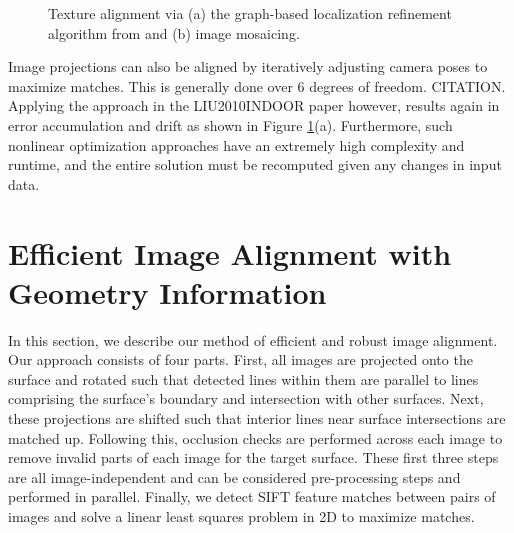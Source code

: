 \documentclass[]{spie}  %
\begin{document}
\begin{figure}
  \centering

  \centering {}
  \caption{Texture alignment via (a) the graph-based localization
    refinement algorithm from \cite{chen2010indoor} and (b) image
    mosaicing.}
  \label{fig:mosaic3D}
\end{figure}

Image projections can also be aligned by iteratively adjusting camera
poses to maximize matches. This is generally done over 6 degrees of
freedom. CITATION. Applying the approach in the LIU2010INDOOR paper
however, results again in error accumulation and drift as shown in
Figure \ref{fig:mosaic3D}(a). Furthermore, such nonlinear optimization
approaches have an extremely high complexity and runtime, and the
entire solution must be recomputed given any changes in input data.


\section{Efficient Image Alignment with Geometry Information}

In this section, we describe our method of efficient and robust image
alignment. Our approach consists of four parts. First, all images are
projected onto the surface and rotated such that detected lines within
them are parallel to lines comprising the surface's boundary and
intersection with other surfaces. Next, these projections are shifted
such that interior lines near surface intersections are matched
up. Following this, occlusion checks are performed across each image
to remove invalid parts of each image for the target surface. These
first three steps are all image-independent and can be considered
pre-processing steps and performed in parallel. Finally, we detect
SIFT feature matches between pairs of images and solve a linear least
squares problem in 2D to maximize matches.
\end{document}
